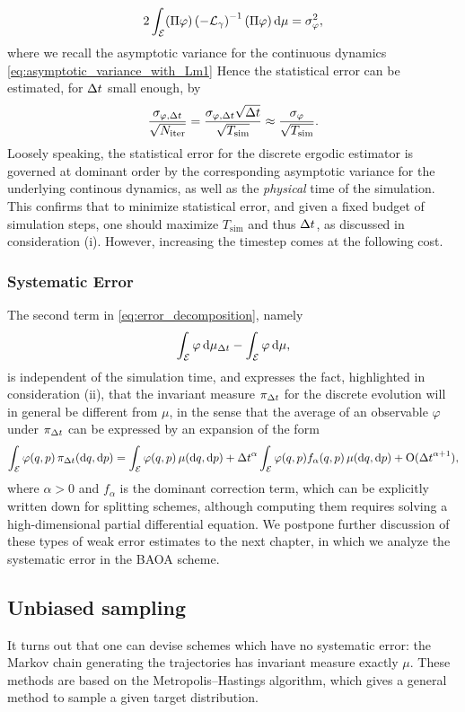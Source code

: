         \[2\int_{\mathcal E}(\Pi\varphi)\left(-\mathcal{L}_\gamma\right)^{-1}(\Pi\varphi)\,\mathrm{d}\mu = \sigma^2_\varphi,\]
        where we recall the asymptotic variance for the continuous dynamics \eqref{eq:asymptotic_variance_with_Lm1}
        Hence the statistical error can be estimated, for ${\Delta t}$ small enough, by 
        \[\frac{\sigma_{\varphi,{\Delta t}}}{\sqrt{N_{\mathrm{iter}}}}=\frac{\sigma_{\varphi,{\Delta t}}\sqrt{{\Delta t}}}{\sqrt{T_{\mathrm{sim}}}}\approx \frac{\sigma_\varphi}{\sqrt{T_{\mathrm{sim}}}}.\]
        Loosely speaking, the statistical error for the discrete ergodic estimator is governed at dominant order by the corresponding asymptotic variance for the underlying continous dynamics, as well as the \textit{physical} time of the simulation.
        This confirms that to minimize statistical error, and given a fixed budget of simulation steps, one should maximize $T_{\mathrm{sim}}$ and thus ${\Delta t}$, as discussed in consideration (i).
        However, increasing the timestep comes at the following cost.

        \subsubsection{Systematic Error}
        The second term in \eqref{eq:error_decomposition}, namely
         \[\int_\mathcal{E}\varphi\,\mathrm{d} \mu_{{\Delta t}}-\int_{\mathcal E}\varphi \,\mathrm{d} \mu,\]
        is independent of the simulation time, and expresses the fact, highlighted in consideration (ii), 
        that the invariant measure $\pi_{\Delta t}$ for the discrete evolution will in general be different from $\mu$, in the sense that the average of an observable $\varphi$ under $\pi_{\Delta t}$ can be expressed by an expansion of the form
        \begin{equation}
            \label{eq:expansion_of_avg_in_dt}
            \int_{\mathcal E}\varphi(q,p)\,\pi_{\Delta t}(\mathrm{d} q,\mathrm{d} p)=\int_{\mathcal E}\varphi(q,p)\,\mu(\mathrm{d} q,\mathrm{d} p)+{\Delta t}^{\alpha}\int_{\mathcal E}\varphi(q,p)f_{\alpha}(q,p)\,\mu(\mathrm{d} q,\mathrm{d} p)+\mathrm{O}({\Delta t}^{\alpha+1}),
        \end{equation}
        where $\alpha>0$ and $f_{\alpha}$ is the dominant correction term, which can be explicitly written down for splitting schemes, although computing them requires solving a high-dimensional partial differential equation.
        We postpone further discussion of these types of weak error estimates to the next chapter, in which we analyze the systematic error in the BAOA scheme.

    \subsection{Unbiased sampling}
     It turns out that one can devise schemes which have no systematic error: the Markov chain generating the trajectories has invariant measure exactly $\mu$.
     These methods are based on the Metropolis--Hastings algorithm, which gives a general method to sample a given target distribution.
